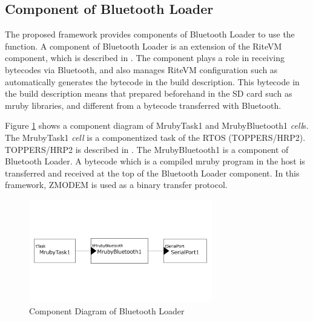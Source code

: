 \documentclass[conference,compsoc]{IEEEtran}
\begin{document}
\subsection{Component of Bluetooth Loader}
The proposed framework provides components of Bluetooth Loader to use the function.
A component of Bluetooth Loader is an extension of the RiteVM component, which is described in \cite{7153813}.
The component plays a role in receiving bytecodes via Bluetooth, and also manages RiteVM configuration such as automatically generates the bytecode in the build description.
This bytecode in the build description means that prepared beforehand in the SD card such as mruby libraries, and different from a bytecode transferred with Bluetooth.

Figure \ref{fig:component_bluetooth} shows a component diagram of MrubyTask1 and MrubyBluetooth1 {\it cell}s.
The MrubyTask1 {\it cell} is a componentized task of the RTOS (TOPPERS/HRP2).
TOPPERS/HRP2 is described in \cite{6913200}.
The MrubyBluetooth1 is a component of Bluetooth Loader.
A bytecode which is a compiled mruby program in the host is transferred and received at the top of the Bluetooth Loader component.
In this framework, ZMODEM \cite{forsberg1988zmodem} is used as a binary transfer protocol.

\begin{figure}[t]
    \centering
    \includegraphics[width=8cm,clip]{figure/component_bluetooth.pdf}
    \caption{Component Diagram of Bluetooth Loader}
    \label{fig:component_bluetooth}
\end{figure}
\end{document}
